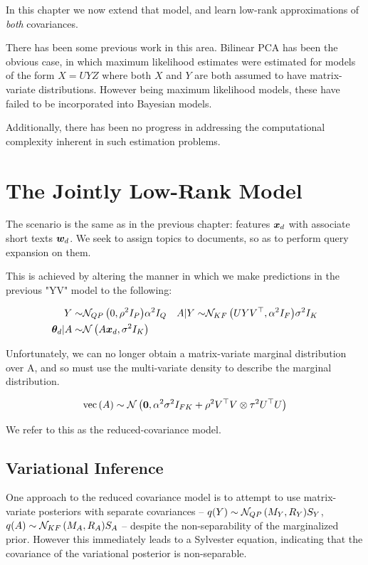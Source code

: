 In this chapter we now extend that model, and learn low-rank approximations of \emph{both} covariances.

There has been some previous work in this area. Bilinear PCA has been the obvious case, in which maximum likelihood estimates\cite{Zhao2012} were estimated for models of the form $X = UYZ$ where both $X$ and $Y$ are both assumed to have matrix-variate distributions. However being maximum likelihood models, these have failed to be incorporated into Bayesian models.

Additionally, there has been no progress in addressing the computational complexity inherent in such estimation problems.




\section{The Jointly Low-Rank Model}

The scenario is the same as in the previous chapter: features $\bm x_d$ with associate short texts ${ \bm w_d }$. We seek to assign topics to documents, so as to perform query expansion on them.

This is achieved by altering the manner in which we make predictions in the previous "YV" model to the following:

\begin{align}
Y \sim & { \mathcal{N}_{QP}\left({0},{\rho^2 I_P}\right) }{\alpha^2 I_Q} & A|Y \sim & { \mathcal{N}_{KF}\left({UYV^\top},{\alpha^2 I_F}\right) }{\sigma^2 I_K} \\
{ \bm \theta_d } | A \sim & \mathcal{N} \left( {A\bm x_d}, {\sigma^2 I_K} \right)
\end{align}

Unfortunately, we can no longer obtain a matrix-variate marginal distribution over A, and so must use the multi-variate density to describe the marginal distribution.  

\begin{align}
\text{vec}\left(A\right) \sim \mathcal{N} \left( {\bm 0}, {\alpha^2 \sigma^2 I_{FK} + \rho^2 V^\top V \otimes \tau^2 U^\top U} \right)
\end{align}

We refer to this as the reduced-covariance model.

\subsection{Variational Inference}
One approach to the reduced covariance model is to attempt to use matrix-variate posteriors with separate covariances -- $q(Y) \sim { \mathcal{N}_{QP}\left({M_Y},{R_Y}\right) }{S_Y}$, $q(A) \sim { \mathcal{N}_{KF}\left({M_A},{R_A}\right) }{S_A}$ --  despite the non-separability of the marginalized prior. However this immediately leads to a Sylvester equation, indicating that the covariance of the variational posterior is non-separable.

